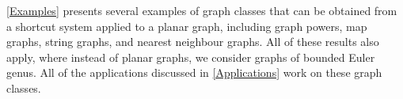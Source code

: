 \documentclass{patmorin}
\renewcommand{\le}{\leqslant}
\renewcommand{\geq}{\geqslant}
\begin{document}

\cref{Examples} presents several examples of graph classes that can be obtained from a shortcut system applied to a planar graph, including graph powers, map graphs, string graphs, and nearest neighbour graphs. All of these results also apply, where instead of planar graphs, we consider graphs of bounded Euler genus.   All of the applications discussed in \cref{Applications} work on these graph classes.

%


%
\end{document}
